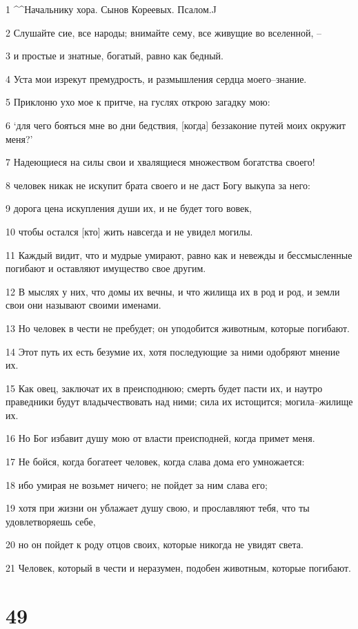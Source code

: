 \par 1 ^^Начальнику хора. Сынов Кореевых. Псалом.^^
\par 2 Слушайте сие, все народы; внимайте сему, все живущие во вселенной, --
\par 3 и простые и знатные, богатый, равно как бедный.
\par 4 Уста мои изрекут премудрость, и размышления сердца моего--знание.
\par 5 Приклоню ухо мое к притче, на гуслях открою загадку мою:
\par 6 `для чего бояться мне во дни бедствия, [когда] беззаконие путей моих окружит меня?'
\par 7 Надеющиеся на силы свои и хвалящиеся множеством богатства своего!
\par 8 человек никак не искупит брата своего и не даст Богу выкупа за него:
\par 9 дорога цена искупления души их, и не будет того вовек,
\par 10 чтобы остался [кто] жить навсегда и не увидел могилы.
\par 11 Каждый видит, что и мудрые умирают, равно как и невежды и бессмысленные погибают и оставляют имущество свое другим.
\par 12 В мыслях у них, что домы их вечны, и что жилища их в род и род, и земли свои они называют своими именами.
\par 13 Но человек в чести не пребудет; он уподобится животным, которые погибают.
\par 14 Этот путь их есть безумие их, хотя последующие за ними одобряют мнение их.
\par 15 Как овец, заключат их в преисподнюю; смерть будет пасти их, и наутро праведники будут владычествовать над ними; сила их истощится; могила--жилище их.
\par 16 Но Бог избавит душу мою от власти преисподней, когда примет меня.
\par 17 Не бойся, когда богатеет человек, когда слава дома его умножается:
\par 18 ибо умирая не возьмет ничего; не пойдет за ним слава его;
\par 19 хотя при жизни он ублажает душу свою, и прославляют тебя, что ты удовлетворяешь себе,
\par 20 но он пойдет к роду отцов своих, которые никогда не увидят света.
\par 21 Человек, который в чести и неразумен, подобен животным, которые погибают.

\chapter{49}

